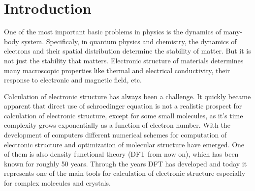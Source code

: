 \message{ !name(document.tex)}\documentclass[openany, longbibliography,slovene,a4paper,12pt]{article}
\begin{document}

\section{Introduction}
One of the most important basic problems in physics is the dynamics of many-body system. Specificaly, in quantum physics and chemistry, the dynamics of electrons and their spatial distribution determine the stability of matter. But it is not just the stability that matters. Electronic structure of materials determines many macroscopic properties like thermal and electrical conductivity, their response to electronic and magnetic field, etc.

Calculation of electronic structure has always been a challenge. It quickly became apparent that direct use of schroedinger equation is not a realistic prospect for calculation of electronic structure, except for some small molecules, as it's time complexity grows exponentially as a function of electron number. With the development of computers different numerical schemes for computation of electronic structure and optimization of molecular structure have emerged. One of them is also density functional theory (DFT from now on), which has been known for roughly 50 years. Through the years DFT has developed and today it represents one of the main tools for calculation of electronic structure especially for complex molecules and crystals.
\end{document}
